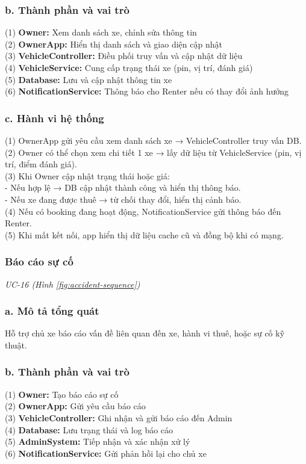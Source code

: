 \subsubsection*{b. Thành phần và vai trò}
(1) \textbf{Owner:} Xem danh sách xe, chỉnh sửa thông tin \\
(2) \textbf{OwnerApp:} Hiển thị danh sách và giao diện cập nhật \\
(3) \textbf{VehicleController:} Điều phối truy vấn và cập nhật dữ liệu \\
(4) \textbf{VehicleService:} Cung cấp trạng thái xe (pin, vị trí, đánh giá) \\
(5) \textbf{Database:} Lưu và cập nhật thông tin xe \\
(6) \textbf{NotificationService:} Thông báo cho Renter nếu có thay đổi ảnh hưởng
\subsubsection*{c. Hành vi hệ thống}
(1) OwnerApp gửi yêu cầu xem danh sách xe → VehicleController truy vấn DB. \\
(2) Owner có thể chọn xem chi tiết 1 xe → lấy dữ liệu từ VehicleService (pin, vị trí, điểm đánh giá). \\
(3) Khi Owner cập nhật trạng thái hoặc giá: \\
\quad - Nếu hợp lệ → DB cập nhật thành công và hiển thị thông báo. \\
\quad - Nếu xe đang được thuê → từ chối thay đổi, hiển thị cảnh báo. \\
(4) Nếu có booking đang hoạt động, NotificationService gửi thông báo đến Renter. \\
(5) Khi mất kết nối, app hiển thị dữ liệu cache cũ và đồng bộ khi có mạng.
\subsubsection{Báo cáo sự cố}
\small\textit{UC-16 (Hình \ref{fig:accident-sequence})}
\subsubsection*{a. Mô tả tổng quát}
Hỗ trợ chủ xe báo cáo vấn đề liên quan đến xe, hành vi thuê, hoặc sự cố kỹ thuật.
\subsubsection*{b. Thành phần và vai trò}
(1) \textbf{Owner:} Tạo báo cáo sự cố \\
(2) \textbf{OwnerApp:} Gửi yêu cầu báo cáo \\
(3) \textbf{VehicleController:} Ghi nhận và gửi báo cáo đến Admin \\
(4) \textbf{Database:} Lưu trạng thái và log báo cáo \\
(5) \textbf{AdminSystem:} Tiếp nhận và xác nhận xử lý \\
(6) \textbf{NotificationService:} Gửi phản hồi lại cho chủ xe
